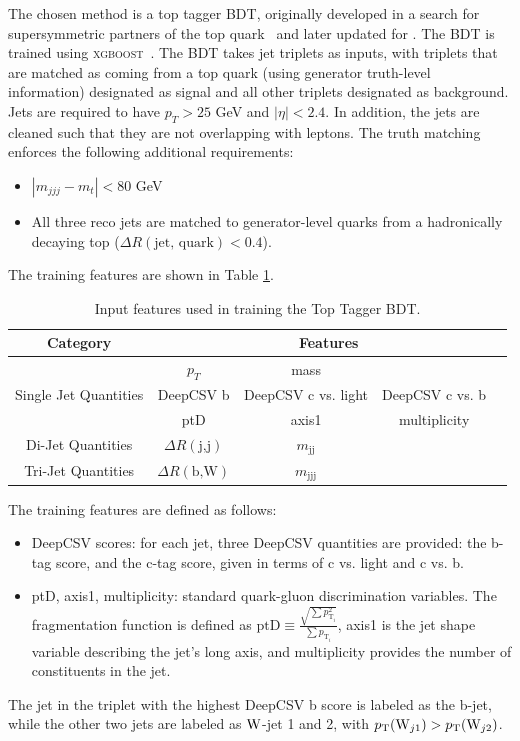 The chosen method is a top tagger BDT, originally developed in a search for supersymmetric partners of the top quark~\cite{stop_search} and later updated for \ttH.
The BDT is trained using \textsc{xgboost}~\cite{xgboost}.
The BDT takes jet triplets as inputs, with triplets that are matched as coming from a top quark (using generator truth-level information) designated as signal and all other triplets designated as background.
Jets are required to have $p_T > 25$ GeV and $|\eta| < 2.4$.
In addition, the jets are cleaned such that they are not overlapping with leptons.
The truth matching enforces the following additional requirements:
\begin{itemize}
    \item $|m_{jjj} - m_t| < 80$ GeV
    \item All three reco jets are matched to generator-level quarks from a hadronically decaying top ($\Delta R(\text{jet, quark}) < 0.4$).
\end{itemize}
The training features are shown in Table \ref{tab:tth_top_tagger_features}.
\begin{table}
	\centering
    \caption{Input features used in training the Top Tagger BDT.}
	\begin{tabular}{c |c c c c} \hline \hline
		Category & \multicolumn{4}{c}{Features} \\ \hline
		\multirow{3}{*}{Single Jet Quantities} & $p_T$ & mass & & \\
		& DeepCSV b & DeepCSV c vs. light & DeepCSV c vs. b & \\
		& ptD & axis1 & multiplicity & \\ \hline
		\multirow{1}{*}{Di-Jet Quantities} & $\Delta R(\text{j,j})$ & $m_{\text{jj}}$ & & \\
		\multirow{1}{*}{Tri-Jet Quantities} & $\Delta R(\text{b,W})$ & $m_{\text{jjj}}$ & &  \\ \hline \hline
	\end{tabular}
    \label{tab:tth_top_tagger_features}
\end{table}
The training features are defined as follows:
\begin{itemize}
    \item DeepCSV scores: for each jet, three DeepCSV quantities are provided: the b-tag score, and the c-tag score, given in terms of c vs. light and c vs. b.
    \item ptD, axis1, multiplicity: standard quark-gluon discrimination variables. The fragmentation function is defined as $\text{ptD} \equiv \frac{\sqrt{\sum p_{\text{T}_i}^2}}{\sum p_{\text{T}_i}}$, axis1 is the jet shape variable describing the jet's long axis, and multiplicity provides the number of constituents in the jet.
\end{itemize}
The jet in the triplet with the highest DeepCSV b score is labeled as the b-jet, while the other two jets are labeled as $\mathrm{W}$-jet 1 and 2, with $p_{\mathrm{T}}(\mathrm{W}_{j1}) > p_{\mathrm{T}}(\mathrm{W}_{j2})$.

